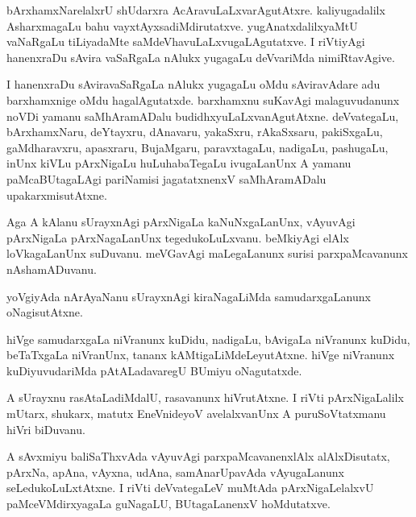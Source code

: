 \begin{mng}
bArxhamxNarelalxrU shUdarxra AcAravuLaLxvarAgutAtxre. kaliyugadalilx AsharxmagaLu bahu vayxtAyxsadiMdirutatxve. yugAnatxdalilxyaMtU vaNaRgaLu tiLiyadaMte saMdeVhavuLaLxvugaLAgutatxve. I riVtiyAgi hanenxraDu sAvira vaSaRgaLa nAlukx yugagaLu deVvariMda nimiRtavAgive.
\end{mng}

\begin{mng}
I hanenxraDu sAviravaSaRgaLa nAlukx yugagaLu oMdu sAviravAdare adu barxhamxnige oMdu hagalAgutatxde. barxhamxnu suKavAgi malaguvudanunx noVDi yamanu saMhAramADalu budidhxyuLaLxvanAgutAtxne. deVvategaLu, bArxhamxNaru, deYtayxru, dAnavaru, yakaSxru, rAkaSxsaru, pakiSxgaLu, gaMdharavxru, apasxraru, BujaMgaru, paravxtagaLu, nadigaLu, pashugaLu, inUnx kiVLu pArxNigaLu huLuhabaTegaLu ivugaLanUnx A yamanu paMcaBUtagaLAgi pariNamisi jagatatxnenxV saMhAramADalu upakarxmisutAtxne.
\end{mng}

\begin{mng}
Aga A kAlanu sUrayxnAgi pArxNigaLa kaNuNxgaLanUnx, vAyuvAgi pArxNigaLa pArxNagaLanUnx tegedukoLuLxvanu. beMkiyAgi elAlx loVkagaLanUnx suDuvanu. meVGavAgi maLegaLanunx surisi parxpaMcavanunx nAshamADuvanu.
\end{mng}

\begin{mng}
yoVgiyAda nArAyaNanu sUrayxnAgi kiraNagaLiMda samudarxgaLanunx oNagisutAtxne.
\end{mng}

\begin{mng}
hiVge samudarxgaLa niVranunx kuDidu, nadigaLu, bAvigaLa niVranunx kuDidu, beTaTxgaLa niVranUnx, tananx kAMtigaLiMdeLeyutAtxne. hiVge niVranunx kuDiyuvudariMda pAtALadavaregU BUmiyu oNagutatxde. 
\end{mng}

\begin{mng}
A sUrayxnu rasAtaLadiMdalU, rasavanunx hiVrutAtxne. I riVti pArxNigaLalilx mUtarx, shukarx, matutx EneVnideyoV avelalxvanUnx A puruSoVtatxmanu hiVri biDuvanu.
\end{mng}

\begin{mng}
A sAvxmiyu baliSaThxvAda vAyuvAgi parxpaMcavanenxlAlx alAlxDisutatx, pArxNa, apAna, vAyxna, udAna, samAnarUpavAda vAyugaLanunx seLedukoLuLxtAtxne. I riVti deVvategaLeV muMtAda pArxNigaLelalxvU paMceVMdirxyagaLa guNagaLU, BUtagaLanenxV hoMdutatxve.
\end{mng}

